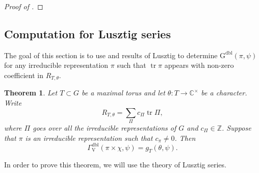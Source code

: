 \documentclass[12pt, reqno]{amsart}
\newtheorem{theorem}{Theorem}[section]
\theoremstyle{definition}
\theoremstyle{definition}
\theoremstyle{definition}
\newcommand{\zIntegers}{\mathbb{Z}}
\newcommand{\cComplex}{\mathbb{C}}
\newcommand{\multiplicativegroup}[1]{#1^{\times}}
\newcommand{\hermitianSpace}{\mathrm{V}}
\newcommand{\fieldCharacter}{\psi}
\newcommand{\trace}{\operatorname{tr}}
\newcommand{\GL}{\mathrm{GL}}
\newcommand{\finiteField}{\mathbb{F}}
\newcommand{\finiteFieldExtension}[1]{\finiteField_{#1}}
\newcommand{\dblGaussSumScalar}[2]{\mathrm{G}^{\mathrm{dbl}}\left(#1, #2\right)}
\newcommand{\dblGammaFactorSpace}[4]{\Gamma^{\mathrm{dbl}}_{#1}\left(#2 \times #3, #4\right)}
\newcommand{\calvin}[1]{\textcolor{orange}{\sffamily ((CALVIN: #1))}}
\begin{document}
\begin{proof}[Proof of ]
\begin{comment}
Write $T \cong \prod_{j=1}^r \multiplicativegroup{\finiteFieldExtension{k_j}} \times \prod_{i=1}^s (\finiteFieldExtension{2m_i}^1)^2$ with $k_i$'s even and $m_i$'s odd \calvin{this is what I need to check... what tori you can get here} and under the above isomorphism $\theta = \alpha_1 \times \dots \times \alpha_r \times \theta_1 \times \dots \times \theta_s \times \epsilon$, where  $\left[\epsilon \colon \left\{\pm 1\right\} \to \multiplicativegroup{\cComplex},\right]$ $\alpha_j \colon \multiplicativegroup{\finiteFieldExtension{k_j}} \to \multiplicativegroup{\cComplex}$ and $\theta_i \colon \finiteFieldExtension{2m_i}^1 \to \multiplicativegroup{\cComplex}$. Then the Frobenius conjugacy class of the Weyl group corresponding to $T$ is represented by having even cycles of lengths $k_1,k_2 \hdots k_r$ and odd cycles of lengths $m_1,m_1,m_2,m_2, \hdots, m_s,m_s$. The map $\Phi$ sends this conjugacy class to the conjugacy class with even cycles $k_1,k_1,k_2,k_2 \hdots k_r,k_r$ and odd cycles $m_1,m_1,m_1,m_1,m_2,m_2,m_2,m_2, \hdots, m_s,m_s,m_s,m_s$. Let $\tilde{T}$ be the torus in $\GL$ corresponding to the conjugacy class with all even cycles of lengths $k_1,k_1,k_2,k_2 \hdots k_r,k_r$ and $2m_1,2m_1,2m_2,2m_2, \hdots, 2m_s,2m_s$. Then $\Phi(s)$ is in this torus \calvin{write out what that means} giving a character $\tilde{\theta}$ on it and 
\[
    \sum_{t \in \tilde{T}} \tilde{\theta}(t) \chi(det(t-1)) = g_T(\theta,\psi).
\]
Since the sum above is a Gauss sum for $\GL$ it is equal to the Gauss sum attatched to the semisimple element $\Phi(s)$.
\end{comment}
\end{proof}

\subsection{Computation for Lusztig series}

The goal of this section is to use  and results of Lusztig to determine $\dblGaussSumScalar{\pi}{\fieldCharacter}$ for any irreducible representation $\pi$ such that $\trace \pi$ appears with non-zero coefficient in $R_{T,\theta}$.

\begin{theorem}
	Let $T \subset G$ be a maximal torus and let $\theta \colon T \to \multiplicativegroup{\cComplex}$ be a character. Write $$R_{T,\theta} = \sum_{\Pi} c_{\Pi} \trace \Pi,$$
	where $\Pi$ goes over all the irreducible representations of $G$ and $c_{\Pi} \in \zIntegers$. Suppose that $\pi$ is an irreducible representation such that $c_{\pi} \ne 0$. Then $$\dblGammaFactorSpace{\hermitianSpace}{\pi}{\chi}{\fieldCharacter} = g_T\left(\theta, \fieldCharacter\right).$$
\end{theorem}
In order to prove this theorem, we will use the theory of Lusztig series.
\end{document}
